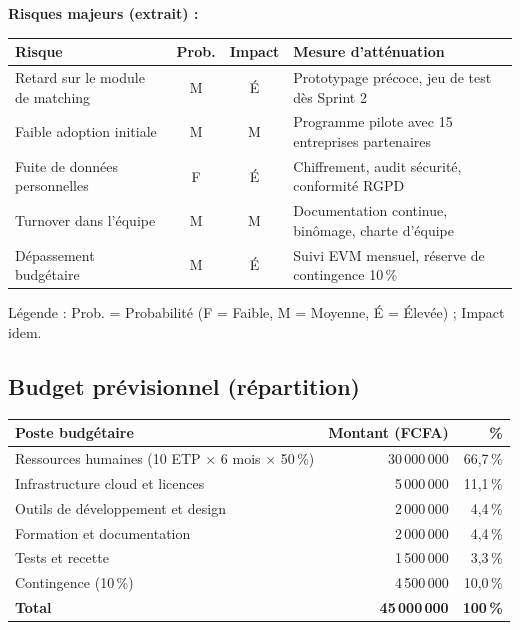 \documentclass[11pt,a4paper]{article}
\begin{document}
\textbf{Risques majeurs (extrait) :}

\small
\begin{tabularx}{\textwidth}{|p{3.5cm}|c|c|X|}
    \hline
    \rowcolor{ifrigray}
    \textbf{Risque} & \textbf{Prob.} & \textbf{Impact} & \textbf{Mesure d'atténuation} \\
    \hline
    Retard sur le module de matching & M & É & Prototypage précoce, jeu de test dès Sprint 2 \\
    \hline
    Faible adoption initiale & M & M & Programme pilote avec 15 entreprises partenaires \\
    \hline
    Fuite de données personnelles & F & É & Chiffrement, audit sécurité, conformité RGPD \\
    \hline
    Turnover dans l'équipe & M & M & Documentation continue, binômage, charte d'équipe \\
    \hline
    Dépassement budgétaire & M & É & Suivi EVM mensuel, réserve de contingence 10\,\% \\
    \hline
\end{tabularx}
\normalsize

\vspace{0.3em}
\noindent Légende : Prob. = Probabilité (F = Faible, M = Moyenne, É = Élevée) ; Impact idem.

\subsection{Budget prévisionnel (répartition)}

\small
\begin{tabularx}{\textwidth}{|X|r|r|}
    \hline
    \rowcolor{ifrigray}
    \textbf{Poste budgétaire} & \textbf{Montant (FCFA)} & \textbf{\%} \\
    \hline
    Ressources humaines (10 ETP $\times$ 6 mois $\times$ 50\,\%) & 30\,000\,000 & 66,7\,\% \\
    \hline
    Infrastructure cloud et licences & 5\,000\,000 & 11,1\,\% \\
    \hline
    Outils de développement et design & 2\,000\,000 & 4,4\,\% \\
    \hline
    Formation et documentation & 2\,000\,000 & 4,4\,\% \\
    \hline
    Tests et recette & 1\,500\,000 & 3,3\,\% \\
    \hline
    Contingence (10\,\%) & 4\,500\,000 & 10,0\,\% \\
    \hline
    \textbf{Total} & \textbf{45\,000\,000} & \textbf{100\,\%} \\
    \hline
\end{tabularx}
\normalsize
\end{document}
